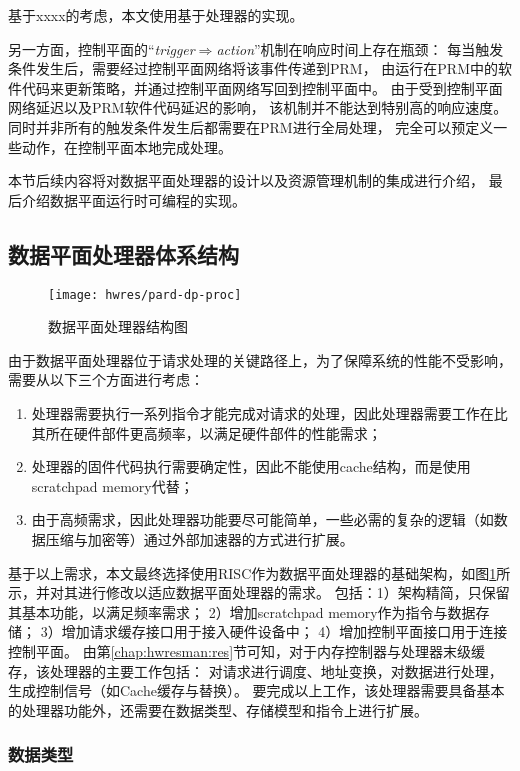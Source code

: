 基于xxxx的考虑，本文使用基于处理器的实现。

另一方面，控制平面的``\emph{trigger$\Rightarrow$action}''机制在响应时间上存在瓶颈：
每当触发条件发生后，需要经过控制平面网络将该事件传递到PRM，
由运行在PRM中的软件代码来更新策略，并通过控制平面网络写回到控制平面中。
由于受到控制平面网络延迟以及PRM软件代码延迟的影响，
该机制并不能达到特别高的响应速度。
同时并非所有的触发条件发生后都需要在PRM进行全局处理，
完全可以预定义一些动作，在控制平面本地完成处理。

本节后续内容将对数据平面处理器的设计以及资源管理机制的集成进行介绍，
最后介绍数据平面运行时可编程的实现。

\subsection{数据平面处理器体系结构}

\begin{figure}[tb]
  \centering
  \texttt{[image: hwres/pard-dp-proc]}
  \caption{数据平面处理器结构图}
  \label{fig:pard-dp-proc}
\end{figure}

由于数据平面处理器位于请求处理的关键路径上，为了保障系统的性能不受影响，需要从以下三个方面进行考虑：

\begin{enumerate}[{（}1{）}]
  \item 处理器需要执行一系列指令才能完成对请求的处理，因此处理器需要工作在比其所在硬件部件更高频率，以满足硬件部件的性能需求；
  \item 处理器的固件代码执行需要确定性，因此不能使用cache结构，而是使用scratchpad memory代替；
  \item 由于高频需求，因此处理器功能要尽可能简单，一些必需的复杂的逻辑（如数据压缩与加密等）通过外部加速器的方式进行扩展。
\end{enumerate}

基于以上需求，本文最终选择使用RISC作为数据平面处理器的基础架构，如图\ref{fig:pard-dp-proc}所示，并对其进行修改以适应数据平面处理器的需求。
包括：1）架构精简，只保留其基本功能，以满足频率需求；
2）增加scratchpad memory作为指令与数据存储；
3）增加请求缓存接口用于接入硬件设备中；
4）增加控制平面接口用于连接控制平面。
由第\ref{chap:hwresman:res}节可知，对于内存控制器与处理器末级缓存，该处理器的主要工作包括：
对请求进行调度、地址变换，对数据进行处理，生成控制信号（如Cache缓存与替换）。
要完成以上工作，该处理器需要具备基本的处理器功能外，还需要在数据类型、存储模型和指令上进行扩展。

\subsubsection{数据类型}

